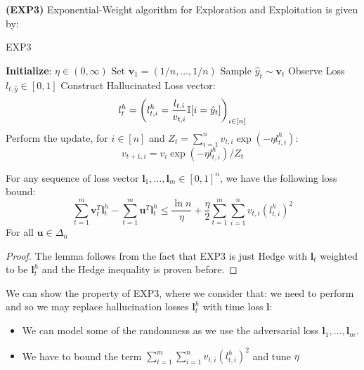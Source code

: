 \begin{definition}{\textbf{(EXP3)}}    
    Exponential-Weight algorithm for Exploration and Exploitation is given by:
    \begin{algorithm}[H]
        \caption{EXP3}
        \begin{algorithmic}[1]
            \State \textbf{Initialize}: $\eta \in (0, \infty)$
            \State Set $\boldsymbol v_1 = (1/n, \dots, 1/n)$
                \State Sample $\hat{y}_t \sim \boldsymbol v_t$
                \State Observe Loss $l_{t, \hat{y}} \in [0, 1]$
                \State Construct Hallucinated Loss vector:
                \begin{equation*}
                    l^h_t = \left( l^h_{t, i} = \frac{l_{t, i}}{v_{t, i}} \mathbb{I}[i = \hat{y}_t]  \right)_{i \in [n]}
                \end{equation*}
                \State Perform the update, for $i\in[n]$ and $Z_t = \sum^n_{i=1}v_{t,i}\exp(-\eta l^h_{t, i})$:
                \begin{equation*}
                    v_{t+1, i} = v_i\exp(-\eta l^h_{t, i})/Z_t
                \end{equation*}
            \EndFor
        \end{algorithmic} 
    \end{algorithm}
\end{definition}

\begin{lemma}  
    For any sequence of loss vector $\boldsymbol l_1,\dots,\boldsymbol l_m \in [0, 1]^n$, we have the following loss bound:
    \begin{equation*}
        \sum^m_{t=1}\boldsymbol v_t^T\boldsymbol l^h_t - \sum^m_{t=1}\boldsymbol u^T\boldsymbol l^h_t \le \frac{\ln n}{\eta} + \frac{\eta}{2}\sum^m_{t=1}\sum^n_{i=1}v_{t, i}(l^h_{t, i})^2
    \end{equation*}
    For all $\boldsymbol u \in \Delta_n$
\end{lemma}
\begin{proof}
    The lemma follows from the fact that EXP3 is just Hedge with $\boldsymbol l_t$ weighted to be $\boldsymbol l^h_t$ and the Hedge inequality is proven before. 
\end{proof}

\begin{remark}
    We can show the property of EXP3, where we consider that: we need to perform and so we may replace hallucination losses $\boldsymbol l^h_t$ with time loss $\boldsymbol l$:
    \begin{itemize}
        \item We can model some of the randomness as we use the adversarial loss $\boldsymbol l_1,\dots,\boldsymbol l_m$. 
        \item We have to bound the term $\sum^m_{t=1}\sum^n_{i=1}v_{t,i}(l^h_{t,i})^2$ and tune $\eta$
    \end{itemize}
\end{remark}

